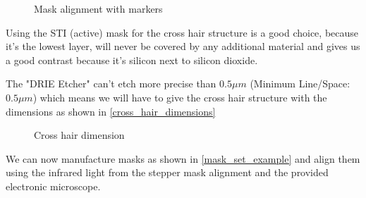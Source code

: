 \begin{figure}[H]
	\centering
	\caption{Mask alignment with markers}
\end{figure}

Using the STI (active) mask for the cross hair structure is a good choice, because it's the lowest layer, will never be covered by any additional material and gives us a good contrast because it's silicon next to silicon dioxide.

\newpage

The "DRIE Etcher" can't etch more precise than $0.5 \mu m$ (Minimum Line/Space: $0.5 \mu m$) which means we will have to give the cross hair structure with the dimensions as shown in \autoref{cross_hair_dimensions}
\begin{figure}[H]
	\centering
	\caption{Cross hair dimension}
	\label{cross_hair_dimensions}
\end{figure}

We can now manufacture masks as shown in \autoref{mask_set_example} and align them using the infrared light from the stepper mask alignment and the provided electronic microscope.

